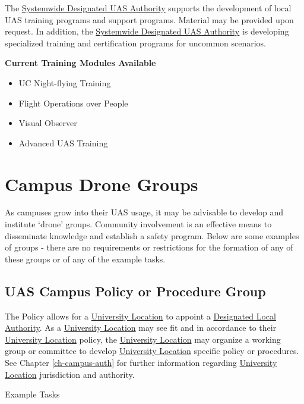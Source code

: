 \documentclass[
]{book}
\providecommand{\tightlist}{%
  \setlength{\itemsep}{0pt}\setlength{\parskip}{0pt}}
\begin{document}
The \protect\hyperlink{SDA}{Systemwide Designated UAS Authority} supports the development of local UAS training programs and support programs. Material may be provided upon request. In addition, the \protect\hyperlink{SDA}{Systemwide Designated UAS Authority} is developing specialized training and certification programs for uncommon scenarios.

\textbf{Current Training Modules Available}

\begin{itemize}
\tightlist
\item
  UC Night-flying Training
\item
  Flight Operations over People
\item
  Visual Observer
\item
  Advanced UAS Training
\end{itemize}

\hypertarget{ch-campus-groups}{%
\chapter{Campus Drone Groups}\label{ch-campus-groups}}

As campuses grow into their UAS usage, it may be advisable to develop and institute `drone' groups. Community involvement is an effective means to disseminate knowledge and establish a safety program. Below are some examples of groups - there are no requirements or restrictions for the formation of any of these groups or of any of the example tasks.

\hypertarget{uas-campus-policy-or-procedure-group}{%
\section{UAS Campus Policy or Procedure Group}\label{uas-campus-policy-or-procedure-group}}

The Policy allows for a \protect\hyperlink{UL}{University Location} to appoint a \protect\hyperlink{DLA}{Designated Local Authority}. As a \protect\hyperlink{UL}{University Location} may see fit and in accordance to their \protect\hyperlink{UL}{University Location} policy, the \protect\hyperlink{UL}{University Location} may organize a working group or committee to develop \protect\hyperlink{UL}{University Location} specific policy or procedures. See Chapter \ref{ch-campus-auth} for further information regarding \protect\hyperlink{UL}{University Location} jurisdiction and authority.

Example Tasks
\end{document}
